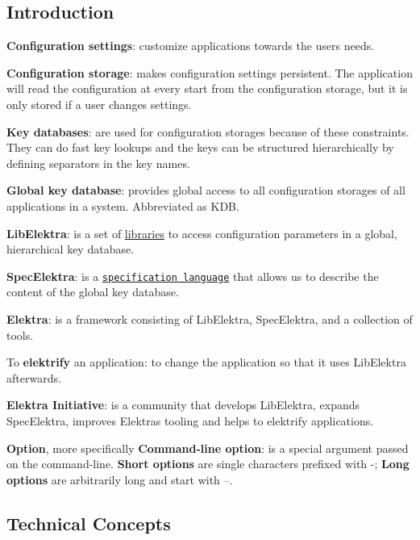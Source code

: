 \subsection*{Introduction}


\begin{DoxyItemize}
\item {\bfseries Configuration settings}\+: customize applications towards the users needs.
\item {\bfseries Configuration storage}\+: makes configuration settings persistent. The application will read the configuration at every start from the configuration storage, but it is only stored if a user changes settings.
\item {\bfseries Key databases}\+: are used for configuration storages because of these constraints. They can do fast key lookups and the keys can be structured hierarchically by defining separators in the key names.
\item {\bfseries Global key database}\+: provides global access to all configuration storages of all applications in a system. Abbreviated as {\ttfamily K\+DB}.
\item {\bfseries Lib\+Elektra}\+: is a set of \hyperlink{src_libs_README_md}{libraries} to access configuration parameters in a global, hierarchical key database.
\item {\bfseries Spec\+Elektra}\+: is a \href{/home/markus/Projekte/Elektra/current/doc/METADATA.ini}{\tt specification language} that allows us to describe the content of the global key database.
\item {\bfseries Elektra}\+: is a framework consisting of Lib\+Elektra, Spec\+Elektra, and a collection of tools.
\item To {\bfseries elektrify} an application\+: to change the application so that it uses Lib\+Elektra afterwards.
\item {\bfseries Elektra Initiative}\+: is a community that develops Lib\+Elektra, expands Spec\+Elektra, improves Elektra\textquotesingle{}s tooling and helps to elektrify applications.
\item {\bfseries Option}, more specifically {\bfseries Command-\/line option}\+: is a special argument passed on the command-\/line. {\bfseries Short options} are single characters prefixed with \textquotesingle{}-\/\textquotesingle{}; {\bfseries Long options} are arbitrarily long and start with \textquotesingle{}--\textquotesingle{}.
\end{DoxyItemize}

\subsection*{Technical Concepts}


